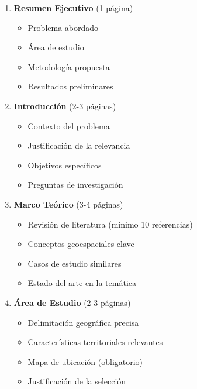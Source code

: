 \documentclass[11pt,letterpaper]{article}
\begin{document}
\begin{enumerate}[label=\arabic*.]
    \item \textbf{Resumen Ejecutivo} (1 página)
    \begin{itemize}
        \item Problema abordado
        \item Área de estudio
        \item Metodología propuesta
        \item Resultados preliminares
    \end{itemize}

    \item \textbf{Introducción} (2-3 páginas)
    \begin{itemize}
        \item Contexto del problema
        \item Justificación de la relevancia
        \item Objetivos específicos
        \item Preguntas de investigación
    \end{itemize}

    \item \textbf{Marco Teórico} (3-4 páginas)
    \begin{itemize}
        \item Revisión de literatura (mínimo 10 referencias)
        \item Conceptos geoespaciales clave
        \item Casos de estudio similares
        \item Estado del arte en la temática
    \end{itemize}

    \item \textbf{Área de Estudio} (2-3 páginas)
    \begin{itemize}
        \item Delimitación geográfica precisa
        \item Características territoriales relevantes
        \item Mapa de ubicación (obligatorio)
        \item Justificación de la selección
    \end{itemize}


\end{enumerate}
\end{document}
